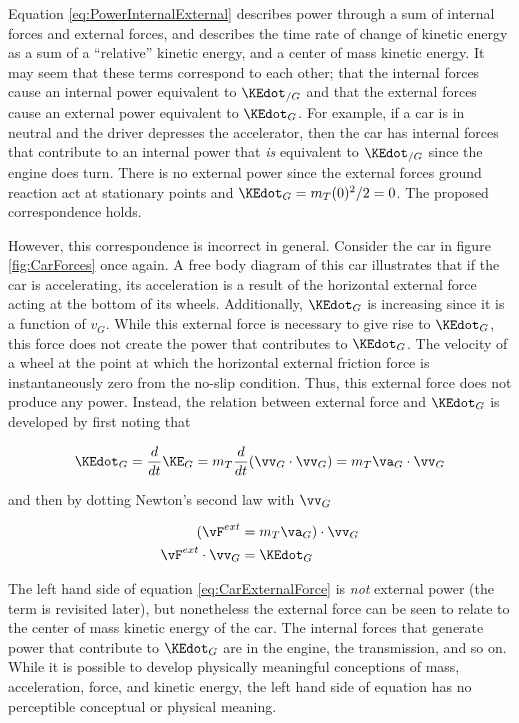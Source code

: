 Equation \ref{eq:PowerInternalExternal} describes power through a sum of internal forces and external forces, and describes the time rate of change of kinetic energy as a sum of a ``relative'' kinetic energy, and a center of mass kinetic energy. It may seem that these terms correspond to each other; that the internal forces cause an internal power equivalent to $\KEdot_{/G}$ and that the external forces cause an external power equivalent to $\KEdot_{G}$. For example, if a car is in neutral and the driver depresses the accelerator, then the car has internal forces that contribute to an internal power that \textit{is} equivalent to $\KEdot_{/G}$ since the engine does turn. There is no external power since the external forces ground reaction act at stationary points and $\KEdot_{G} = m_{T}(0)^2/2 = 0$. The proposed correspondence holds.

However, this correspondence is incorrect in general. Consider the car in figure \ref{fig:CarForces} once again. A free body diagram of this car illustrates that if the car is accelerating, its acceleration is a result of the horizontal external force acting at the bottom of its wheels. Additionally, $\KEdot_{G}$ is increasing since it is a function of $v_{G}$. While this external force is necessary to give rise to $\KEdot_{G}$, this force does not create the power that contributes to $\KEdot_{G}$. The velocity of a wheel at the point at which the horizontal external friction force is instantaneously zero from the no-slip condition. Thus, this external force does not produce any power. Instead, the relation between external force and $\KEdot_{G}$ is developed by first noting that

\begin{equation}
\KEdot_{G} = \frac{d}{dt} \KE_{G} = m_{T}  \frac{d}{dt} (\vv_{G} \cdot \vv_{G}) = m_{T} \va_{G} \cdot \vv_{G}
\end{equation}

and then by dotting Newton's second law with $\vv_{G}$

\begin{align}
( \vF^{ext} &= m_{T} \va_{G} ) \cdot \vv_{G} \\
\vF^{ext} \cdot \vv_{G} &= \KEdot_{G} \label{eq:CarExternalForce}
\end{align}

The left hand side of equation \ref{eq:CarExternalForce} is \emph{not} external power (the term is revisited later), but nonetheless the external force can be seen to relate to the center of mass kinetic energy of the car. The internal forces that generate power that contribute to $\KEdot_{G}$ are in the engine, the transmission, and so on. While it is possible to develop physically meaningful conceptions of mass, acceleration, force, and kinetic energy, the left hand side of equation \label{eq:CarExternalForce} has no perceptible conceptual or physical meaning.

